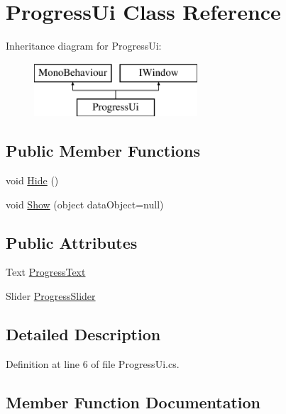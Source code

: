 \hypertarget{class_progress_ui}{}\section{Progress\+Ui Class Reference}
\label{class_progress_ui}
Inheritance diagram for Progress\+Ui\+:\begin{figure}[H]
\begin{center}
\leavevmode
\includegraphics[height=2.000000cm]{class_progress_ui}
\end{center}
\end{figure}
\subsection*{Public Member Functions}
\begin{DoxyCompactItemize}
\item 
void \mbox{\hyperlink{class_progress_ui_ac3ee49ce28ddca827f90fe13d434c9f4}{Hide}} ()
\item 
void \mbox{\hyperlink{class_progress_ui_a59904d8df7c6b696637d26648a26a0b3}{Show}} (object data\+Object=null)
\end{DoxyCompactItemize}
\subsection*{Public Attributes}
\begin{DoxyCompactItemize}
\item 
Text \mbox{\hyperlink{class_progress_ui_a510b0d8d5a1e7cf565beeca2b26d0463}{Progress\+Text}}
\item 
Slider \mbox{\hyperlink{class_progress_ui_a4ddaef0f03a85ae79966ca78243da48f}{Progress\+Slider}}
\end{DoxyCompactItemize}


\subsection{Detailed Description}


Definition at line 6 of file Progress\+Ui.\+cs.



\subsection{Member Function Documentation}
\mbox{\label{class_progress_ui_ac3ee49ce28ddca827f90fe13d434c9f4}} 
